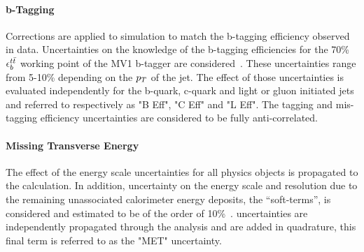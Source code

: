 \paragraph{b-Tagging}  Corrections are applied to simulation
to match the b-tagging efficiency observed  in data. Uncertainties on the knowledge 
of the b-tagging efficiencies for the 70\% $\epsilon_b^{t\bar{t}}$ working point of the MV1 b-tagger are
considered~\cite{BtaggingScaleFactors,BtaggingScaleFactorsNew}. These uncertainties range from 5-10\%  depending on the $p_{T}$ of the jet. 
The effect of those uncertainties is evaluated independently for the
 b-quark, c-quark and light or gluon initiated jets and referred to respectively 
 as "B  Eff", "C Eff" and "L Eff". The tagging and mis-tagging efficiency uncertainties 
 are considered to be fully anti-correlated. 

\paragraph{Missing Transverse Energy}
The effect of the energy scale uncertainties for all  physics objects is propagated to the \met calculation.
In addition, uncertainty on the energy scale and resolution due to the remaining unassociated 
calorimeter energy deposits, the ``soft-terms'', is considered and estimated to be of the order of 10\%~\cite{ETMISS}. 
\met uncertainties are independently propagated through the analysis and are
added in quadrature, this final term is referred to as the "MET" uncertainty.


